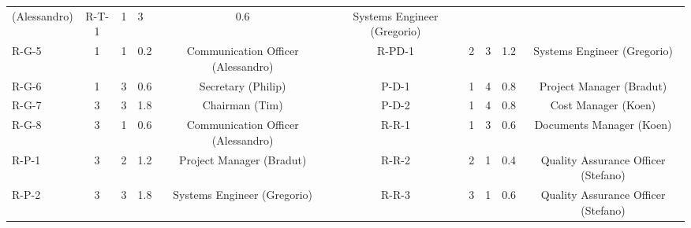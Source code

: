 \begin{table}[ht]
{\begin{tabular}{lcclcccclc}
                                  (Alessandro) & R-T-1 & 1                                                              & 3                                                          & {\cellcolor[rgb]{0.082,0.922,0.843}}0.6 & Systems Engineer (Gregorio)             \\
                                  R-G-5 & 1 & 1 & {\cellcolor[rgb]{0.082,0.922,0.843}}0.2  & Communication Officer
                                  (Alessandro)            & R-PD-1 & 2                                                              & 3                                                          & {\cellcolor[rgb]{0.553,0.82,0.459}}1.2  & Systems Engineer (Gregorio)             \\
                                  R-G-6 & 1 & 3 & {\cellcolor[rgb]{0.082,0.922,0.843}}0.6 & Secretary (Philip)         & P-D-1 & 1                                                              & 4                                                          & {\cellcolor[rgb]{0.082,0.922,0.843}}0.8 & Project Manager (Bradut)                \\
                                  R-G-7 & 3 & 3 & {\cellcolor[rgb]{0.537,0.722,0.482}}1.8 & Chairman (Tim)         & P-D-2 & 1 & 4 & {\cellcolor[rgb]{0.082,0.922,0.843}}0.8 & Cost Manager (Koen) \\
                                  R-G-8 & 3 & 1 & {\cellcolor[rgb]{0.082,0.922,0.843}}0.6 & Communication Officer (Alessandro)         & R-R-1 & 1 & 3 & {\cellcolor[rgb]{0.082,0.922,0.843}}0.6 & Documents Manager (Koen) \\
                                  R-P-1 & 3 & 2 & {\cellcolor[rgb]{0.553,0.82,0.459}}1.2 & Project Manager (Bradut)         & R-R-2 & 2 & 1 & {\cellcolor[rgb]{0.082,0.922,0.843}}0.4 & Quality Assurance Officer (Stefano) \\
                                  R-P-2 & 3 & 3 & {\cellcolor[rgb]{0.537,0.722,0.482}}1.8 & Systems Engineer (Gregorio)         & R-R-3 & 3 & 1 & {\cellcolor[rgb]{0.082,0.922,0.843}}0.6 & Quality Assurance Officer (Stefano) \\ \hline
    \end{tabular}}
    
\end{table}


